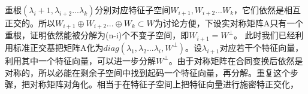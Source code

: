 重根$(\lambda_i+1,\lambda_{i+2}...\lambda_k)$分别对应特征子空间$W_{i+1},W_{i+2}...W_k$，它们依然是相互正交的。所以$W_{i+1}\oplus W_{i+2}...\oplus W_k\subset W$为讨论方便，下设实对称矩阵A只有一个重根，证明依然能被分解为(n-i)个不变子空间，即$W_{i+1}=W^{\perp}$。
此时我们已经利用标准正交基把矩阵A化为$diag(\lambda_1,\lambda_2...\lambda_i,W^{\perp})$。设$\lambda_{i+1}$对应若干个特征向量，利用其中一个特征向量，可以进一步分解$W^{\perp}$。由于对称矩阵在合同变换后依然是对称的，所以必能在剩余子空间中找到起码一个特征向量，再分解。重复这个步骤，把对称矩阵对角化。相当于在特征子空间上把特征向量进行施密特正交化，